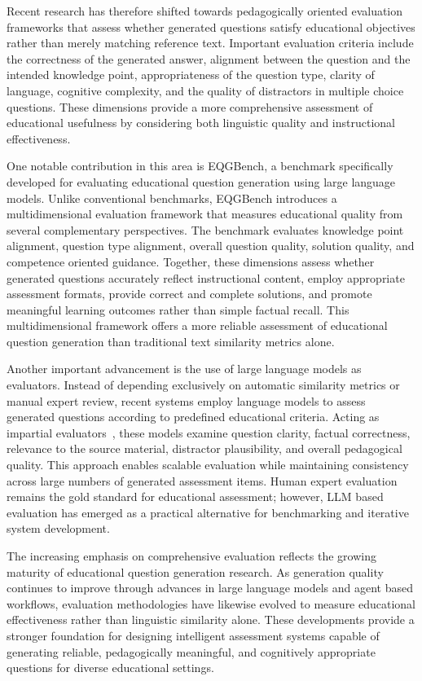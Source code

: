 Recent research has therefore shifted towards pedagogically oriented evaluation frameworks that assess whether generated questions satisfy educational objectives rather than merely matching reference text. Important evaluation criteria include the correctness of the generated answer, alignment between the question and the intended knowledge point, appropriateness of the question type, clarity of language, cognitive complexity, and the quality of distractors in multiple choice questions. These dimensions provide a more comprehensive assessment of educational usefulness by considering both linguistic quality and instructional effectiveness.

One notable contribution in this area is EQGBench, a benchmark specifically developed for evaluating educational question generation using large language models. Unlike conventional benchmarks, EQGBench introduces a multidimensional evaluation framework that measures educational quality from several complementary perspectives. The benchmark evaluates knowledge point alignment, question type alignment, overall question quality, solution quality, and competence oriented guidance. Together, these dimensions assess whether generated questions accurately reflect instructional content, employ appropriate assessment formats, provide correct and complete solutions, and promote meaningful learning outcomes rather than simple factual recall. This multidimensional framework offers a more reliable assessment of educational question generation than traditional text similarity metrics alone. \cite{eqgbench2025}

Another important advancement is the use of large language models as evaluators. Instead of depending exclusively on automatic similarity metrics or manual expert review, recent systems employ language models to assess generated questions according to predefined educational criteria. Acting as impartial evaluators~\cite{liu2023geval}, these models examine question clarity, factual correctness, relevance to the source material, distractor plausibility, and overall pedagogical quality. This approach enables scalable evaluation while maintaining consistency across large numbers of generated assessment items. Human expert evaluation remains the gold standard for educational assessment; however, LLM based evaluation has emerged as a practical alternative for benchmarking and iterative system development.

The increasing emphasis on comprehensive evaluation reflects the growing maturity of educational question generation research. As generation quality continues to improve through advances in large language models and agent based workflows, evaluation methodologies have likewise evolved to measure educational effectiveness rather than linguistic similarity alone. These developments provide a stronger foundation for designing intelligent assessment systems capable of generating reliable, pedagogically meaningful, and cognitively appropriate questions for diverse educational settings. \cite{eqgbench2025,requesta2026}
